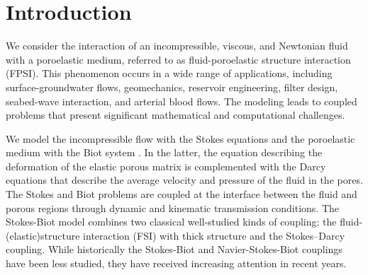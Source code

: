 \documentclass[11pt]{article}
\begin{document}
\section{Introduction}

We consider the interaction of an incompressible, viscous, and Newtonian fluid
with a poroelastic medium, referred to as fluid-poroelastic structure interaction (FPSI). This phenomenon occurs in a wide range of applications, including
surface-groundwater flows, geomechanics, reservoir engineering, filter design, seabed-wave interaction, and arterial blood flows. The modeling leads to coupled problems that present significant mathematical and computational challenges. 

We model the incompressible flow with the Stokes equations and the poroelastic medium with the
Biot system \cite{b1941}. In the latter, the equation describing the deformation of the elastic porous matrix is complemented with the Darcy equations that describe the average
velocity and pressure of the fluid in the pores. The Stokes and Biot problems are coupled at the interface between the fluid and porous regions through dynamic and kinematic transmission conditions. The Stokes-Biot model combines two classical well-studied kinds of coupling: the fluid-(elastic)structure interaction (FSI) with thick structure and the Stokes–Darcy coupling. While historically the Stokes-Biot and Navier-Stokes-Biot couplings have been less studied, they have received increasing attention in recent years.
\end{document}
